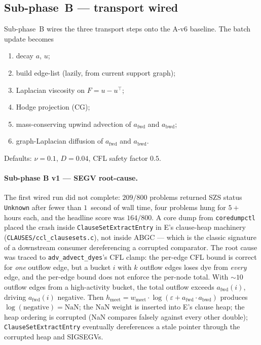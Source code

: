 \documentclass[11pt]{article}
\newcommand{\lpath}[1]{\texttt{\nolinkurl{#1}}}
\newcommand{\lid}[1]{{\ttfamily\nolinkurl{#1}}}
\begin{document}
\subsection{Sub-phase~B --- transport wired}\label{sec:phaseB}

Sub-phase~B wires the three transport steps onto the A-v6 baseline. The
batch update becomes
\begin{enumerate}
\item decay $a$, $u$;
\item build edge-list (lazily, from current support graph);
\item Laplacian viscosity on $F = u - u^{\top}$;
\item Hodge projection (CG);
\item mass-conserving upwind advection of $a_\mathrm{fwd}$ and $a_\mathrm{bwd}$;
\item graph-Laplacian diffusion of $a_\mathrm{fwd}$ and $a_\mathrm{bwd}$.
\end{enumerate}
Defaults: $\nu = 0.1$, $D = 0.04$, CFL safety factor $0.5$.

\paragraph{Sub-phase B v1 --- SEGV root-cause.}
The first wired run did not complete: $209/800$ problems returned
SZS status \lid{Unknown} after fewer than $1$~second of wall time, four
problems hung for $5+$ hours each, and the headline score was $164/800$.
A core dump from \lid{coredumpctl} placed the crash inside
\lid{ClauseSetExtractEntry} in E's clause-heap machinery
(\lpath{CLAUSES/ccl_clausesets.c}), not inside ABGC --- which is the
classic signature of a downstream consumer dereferencing a corrupted
comparator. The root cause was traced to
\lid{adv_advect_dyes}'s CFL clamp: the per-edge CFL bound is correct for
\emph{one} outflow edge, but a bucket $i$ with $k$ outflow edges loses
dye from \emph{every} edge, and the per-edge bound does not enforce the
per-node total. With $\sim 10$ outflow edges from a high-activity bucket,
the total outflow exceeds $a_\mathrm{fwd}(i)$, driving $a_\mathrm{fwd}(i)$
negative. Then $h_\mathrm{meet} = w_\mathrm{meet}\cdot\log(\varepsilon
+ a_\mathrm{fwd}\cdot a_\mathrm{bwd})$ produces $\log(\textrm{negative}) =
\mathrm{NaN}$; the NaN weight is inserted into E's clause heap; the heap
ordering is corrupted (NaN compares falsely against every other double);
\lid{ClauseSetExtractEntry} eventually dereferences a stale pointer
through the corrupted heap and SIGSEGVs.
\end{document}
